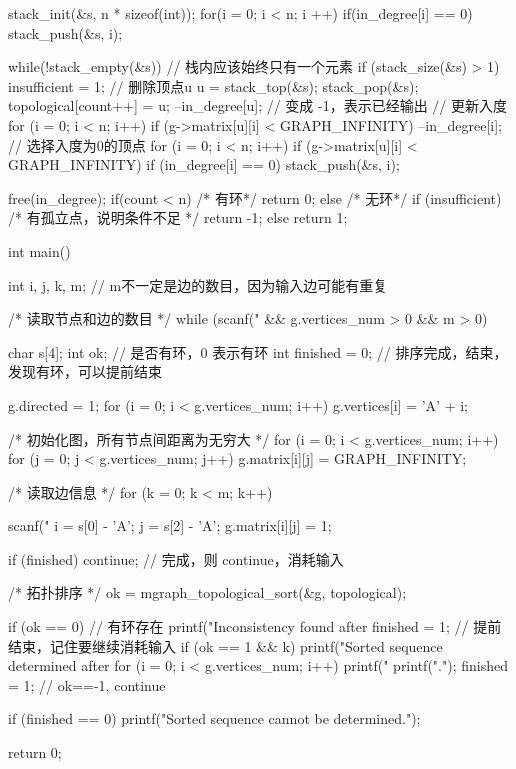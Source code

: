 \begin{Codex}[label=poj_1094.c]
{    stack_init(&s, n * sizeof(int));
    for(i = 0; i < n; i ++) {
        if(in_degree[i] == 0) {
            stack_push(&s, i);
        }
    }

    while(!stack_empty(&s)) {
        // 栈内应该始终只有一个元素
        if (stack_size(&s) > 1) insufficient = 1;
        // 删除顶点u
        u = stack_top(&s); stack_pop(&s);
        topological[count++] = u;
        --in_degree[u];  // 变成 -1，表示已经输出
        // 更新入度
        for (i = 0; i < n; i++) if (g->matrix[u][i] < GRAPH_INFINITY) {
            --in_degree[i];
        }
        // 选择入度为0的顶点
        for (i = 0; i < n; i++) if (g->matrix[u][i] < GRAPH_INFINITY) {
            if (in_degree[i] == 0) stack_push(&s, i);
        }
    }

    free(in_degree);
    if(count < n) { /* 有环*/
        return 0;
    } else { /* 无环*/
        if (insufficient) {  /* 有孤立点，说明条件不足 */
            return -1;
        } else {
            return 1;
        }
    }
}


int main() {
    int i, j, k, m;  // m不一定是边的数目，因为输入边可能有重复

    /* 读取节点和边的数目 */
    while (scanf("%
            && g.vertices_num > 0 && m > 0) {
        char s[4];
        int ok;  // 是否有环，0 表示有环
        int finished = 0;  // 排序完成，结束，发现有环，可以提前结束

        g.directed = 1;
        for (i = 0; i < g.vertices_num; i++) g.vertices[i] = 'A' + i;

        /* 初始化图，所有节点间距离为无穷大 */
        for (i = 0; i < g.vertices_num; i++) {
            for (j = 0; j < g.vertices_num; j++) {
                g.matrix[i][j] = GRAPH_INFINITY;
            }
        }

        /* 读取边信息 */
        for (k = 0; k < m; k++) {
            scanf("%
            i = s[0] - 'A';
            j = s[2] - 'A';
            g.matrix[i][j] = 1;

            if (finished) continue;    // 完成，则 continue，消耗输入

            /* 拓扑排序 */
            ok = mgraph_topological_sort(&g, topological);

            if (ok == 0) {  // 有环存在
                printf("Inconsistency found after %
                finished = 1;  // 提前结束，记住要继续消耗输入
            }
            if (ok == 1 && k) {
                printf("Sorted sequence determined after %
                for (i = 0; i < g.vertices_num; i++) {
                    printf("%
                }
                printf(".\n");
                finished = 1;
            }
            // ok==-1, continue
        }
        if (finished == 0) {
            printf("Sorted sequence cannot be determined.\n");
        }
    }
    return 0;
}
\end{Codex}

